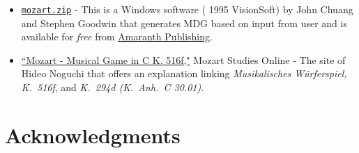 \documentclass[a4paper,x11names,svgnames,10pt]{article}
\begin{document}
{\begin{itemize}
	\item \href{https://www.amaranthpublishing.com/mozart.zip}{\tt mozart.zip} -  This is a Windows software ({\small\textcopyright} 1995 VisionSoft) by John Chuang and Stephen Goodwin that generates MDG based on input from user and is available for {\it free} from  \href{http://www.amaranthpublishing.com/MozartDiceGame.htm}{Amaranth Publishing}.  
	
	\item \href{http://www.asahi-net.or.jp/\~rb5h-ngc/e/k516f.htm}{``Mozart - Musical Game in C K. 516f,"}	Mozart Studies Online - The site of Hideo Noguchi that offers an explanation linking {\em Musikalisches W\"{u}rferspiel, K.\ 516f}, and  {\em K.\ 294d (K.\ Anh.\ C 30.01)}. 
\end{itemize}

\newpage
\section{Acknowledgments}
}
\end{document}
